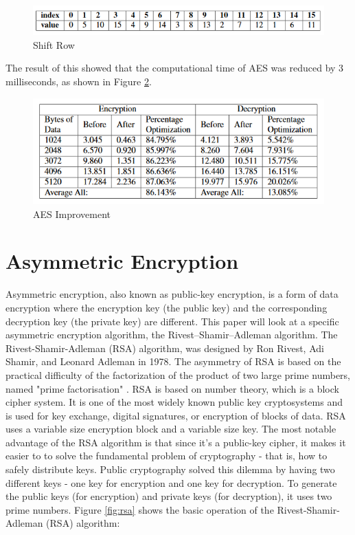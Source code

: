 \documentclass[journal]{IEEEtran}
\begin{document}
\newline
\begin{figure}[!h]
    \centering
    \includegraphics[scale=.5]{shift_row}
    \caption{Shift Row}
    \label{fig:aes_shift_row}
\end{figure}

The result of this showed that the computational time of AES was reduced by 3 milliseconds, as shown in Figure \ref{fig:aes_new_times}.

\newline
\begin{figure}[!h]
    \centering
    \includegraphics[scale=.7]{aes_improvement}
    \caption{AES Improvement}
    \label{fig:aes_new_times}
\end{figure}

\section{\textbf{Asymmetric Encryption}}
Asymmetric encryption, also known as public-key encryption, is a form of data encryption where the encryption key (the public key) and the corresponding decryption key (the private key) are different. This paper will look at a specific asymmetric encryption algorithm, the Rivest–Shamir–Adleman algorithm. The Rivest-Shamir-Adleman (RSA) algorithm, was designed by Ron Rivest, Adi Shamir, and Leonard Adleman in 1978. The asymmetry of RSA is based on the practical difficulty of the factorization of the product of two large prime numbers, named "prime factorisation" \cite{prime_factorization}. RSA is based on number theory, which is a block cipher system. It is one of the most widely known public key cryptosystems and is used for key exchange, digital signatures, or encryption of blocks of data. RSA uses a variable size encryption block and a variable size key. The most notable advantage of the RSA algorithm is that since it's a public-key cipher, it makes it easier to to solve the fundamental problem of cryptography - that is, how to safely distribute keys. Public cryptography solved this dilemma by having two different keys - one key for encryption and one key for decryption. To generate the public keys (for encryption) and private keys (for decryption), it uses two prime numbers. Figure \ref{fig:rsa} shows the basic operation of the Rivest-Shamir-Adleman (RSA) algorithm:
\end{document}
